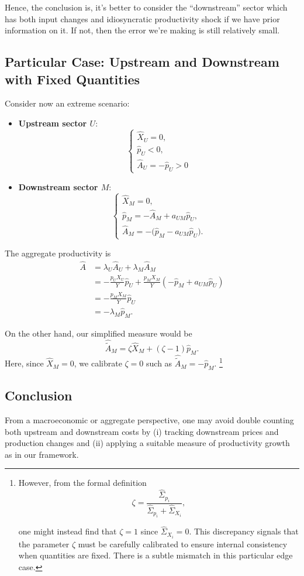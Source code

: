 \documentclass[11pt]{article}
\begin{document}
Hence, the conclusion is, it's better to consider the ``downstream'' sector which has both input changes and idiosyncratic productivity shock if we have prior information on it. If not, then the error we're making is still relatively small. 



\subsection{Particular Case: Upstream and Downstream with Fixed Quantities}
\label{sec:particularcase}

Consider now an extreme scenario:
\begin{itemize}
    \item \textbf{Upstream sector $U$}: 
    \[
    \begin{cases}
    \hat{X}_U = 0,\\
    \hat{p}_U < 0,\\
    \hat{A}_U = - \hat{p}_U > 0
    \end{cases}
    \]
    \item \textbf{Downstream sector $M$}: 
    \[
    \begin{cases}
    \hat{X}_M=0,\\
    \hat{p}_M = - \hat{A}_M  +  a_{UM} \hat{p}_U,\\
    \hat{A}_M = -\bigl(\hat{p}_M - a_{UM} \hat{p}_U\bigr).
    \end{cases}
    \]
\end{itemize}
The aggregate productivity is
\begin{equation}
\begin{aligned}
    \hat{A}&=\lambda_U\hat{A}_U+\lambda_M\hat{A}_M\\
    &=-\frac{p_UX_U}{Y}\hat{p}_U+\frac{p_MX_M}{Y}(-\hat{p}_M + a_{UM}\hat{p}_U)\\
    &=-\frac{p_MX_M}{Y}\hat{p}_U\\
    &=-\lambda_M \hat{p}_M.
\end{aligned}
\end{equation}


On the other hand, our simplified measure would be
\[
    \hat{\tilde{A}}_M 
    = \zeta \hat{X}_M + (\zeta-1) \hat{p}_M.
\]
Here, since $\hat{X}_M = 0$, we calibrate $\zeta=0$ such as  $\hat{\tilde{A}}_M = - \hat{p}_M$. \footnote{
However, from the formal definition 
\[
    \zeta  =  \frac{\hat{\Sigma}_{p_i}}{\hat{\Sigma}_{p_i} + \hat{\Sigma}_{X_i}},
\]

one might instead find that $\zeta=1$ since $\hat{\Sigma}_{X_i}=0$. This discrepancy signals that the parameter $\zeta$ must be carefully calibrated to ensure internal consistency when quantities are fixed. There is a subtle mismatch in this particular edge case.}

\subsection{Conclusion}
From a macroeconomic or aggregate perspective, one may avoid double counting both upstream and downstream costs by (i) tracking downstream prices and production changes and (ii) applying a suitable measure of productivity growth as in our framework. 
\end{document}
